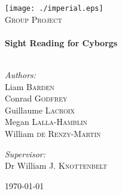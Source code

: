 \begin{titlepage}
    \begin{center}
        \texttt{[image: ./imperial.eps]}~\\[1cm]
        \textsc{\LARGE Group Project} \\[0.5cm]
        \HRule \\[0.4cm]
        {\huge \bfseries Sight Reading for Cyborgs \\[0.4cm]}
        \HRule \\[1.5cm]
            \begin{flushleft}
                \large
                \emph{Authors:}\\
                Liam \textsc{Barden}\\
                Conrad \textsc{Godfrey}\\
                Guillaume \textsc{Lacroix}\\
                Megan \textsc{Lalla-Hamblin}\\
                William \textsc{de Renzy-Martin}\\
            \end{flushleft}
            \begin{flushright}
                \large
                \emph{Supervisor:}\\
                Dr William J. \textsc{Knottenbelt}
            \end{flushright}
        \vfill
        {\large \today}
    \end{center}
\end{titlepage}
